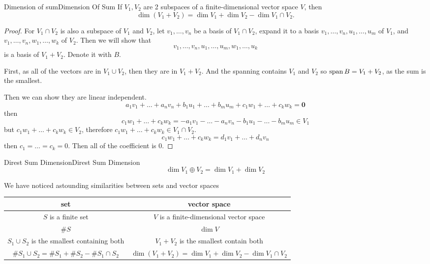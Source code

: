 \documentclass[../main.tex]{subfiles}
\begin{document}
\begin{theorem}{Dimension of sum}{Dimension Of Sum}
If $V_1,V_2$ are 2 subspaces of a finite-dimensional vector space $V$, then 
\begin{equation}
\dim (V_1+V_2) = \dim V_1 + \dim V_2 - \dim V_1\cap V_2.
\end{equation}
\end{theorem}
\begin{proof}
For $V_1\cap V_2$ is also a subspace of $V_1$ and $V_2$, let $v_1, \ldots ,v_n$ be a basis of $V_1\cap V_2$, expand it to a basis $v_1, \ldots ,v_n, u_1, \ldots ,u_m$ of $V_1$, and $v_1, \ldots ,v_n, w_1, \ldots ,w_k$ of $V_2$. Then we will  show that 
\begin{equation*}
v_1, \ldots ,v_n, u_1, \ldots ,u_m, w_1, \ldots ,u_k
\end{equation*}
is a basis of $V_1+V_2$. Denote it with $B$.

First, as all of the vectors are in $V_1\cup V_2$, then they are in $V_1+V_2$. And the spanning contains $V_1$ and $V_2$ so $\operatorname{span} B = V_1+V_2$, as the sum is the smallest.

Then we can show they are linear independent.
\begin{equation}
a_1v_1+ \ldots + a_nv_n + b_1u_1+ \ldots +b_mu_m + c_1w_1+\ldots +c_kw_k = \boldsymbol{0}
\end{equation}
then
\begin{equation*}
c_1w_1+\ldots +c_kw_k = -a_1v_1- \ldots -a_nv_n - b_1u_1 - \ldots -b_mu_m \in V_1
\end{equation*}
but $c_1w_1+\ldots +c_kw_k \in V_2$, therefore $c_1w_1+\ldots +c_kw_k \in V_1\cap V_2$.
\begin{equation*}
c_1w_1+\ldots +c_kw_k = d_1v_1+\ldots +d_nv_n
\end{equation*}
then $c_1=\ldots =c_k=0$.
Then all of the coefficient is  $0$.
\end{proof}

\begin{corollary}{Direst Sum Dimension}{Direst Sum Dimension}
\begin{equation}
\dim V_1 \oplus V_2  = \dim V_1 + \dim V_2
\end{equation}
\end{corollary}

\begin{remark}
We have noticed astounding similarities between sets and vector spaces
\begin{center}
\begin{tabular}{|c|c|}
\hline
\textbf{set} & \textbf{vector space} \\
\hline
$S$ is a finite set & $V$ is a finite-dimensional vector space \\
$\# S$ & $\dim V$ \\
$S_1\cup S_2$ is the smallest containing both & $V_1+V_2$ is the smallest contain both \\
$\# S_1\cup S_2 = \# S_1+\# S_2 - \# S_1\cap S_2$ & $\dim (V_1+V_2) = \dim V_1 + \dim V_2 - \dim V_1\cap V_2$ \\
\hline
\end{tabular}
\end{center}
\end{remark}
\end{document}
